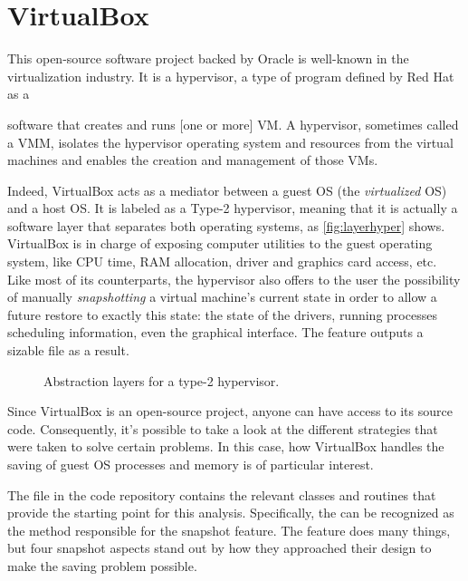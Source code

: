 \section{VirtualBox}\label{sec:virtualbox}
This open-source software project backed by Oracle is well-known in the virtualization industry. It is a hypervisor, a type of program defined by Red Hat as a
\begin{shadedquotation}
	[...] software that creates and runs [one or more] \gls{VM}. A hypervisor, sometimes called a \gls{VMM}, isolates the hypervisor operating system and resources from the virtual machines and enables the creation and management of those VMs.\cite{online:redhat}
\end{shadedquotation}
Indeed, VirtualBox acts as a mediator between a guest OS (the \textit{virtualized} OS) and a host OS. It is labeled as a Type-2 hypervisor, meaning that it is actually a software layer that separates both operating systems, as \autoref{fig:layerhyper} shows. VirtualBox is in charge of exposing computer utilities to the guest operating system, like CPU time, RAM allocation, driver and graphics card access, etc. Like most of its counterparts, the hypervisor also offers to the user the possibility of manually \textit{snapshotting} a virtual machine's current state in order to allow a future restore to exactly this state: the state of the drivers, running processes scheduling information, even the graphical interface. The feature outputs a sizable file as a result.

\begin{figure}
	\centering \scriptsize
	\vspace{-12pt}
	
	\caption{Abstraction layers for a type-2 hypervisor.}
	\label{fig:layerhyper}
	\vspace{-12pt}
\end{figure}
Since VirtualBox is an open-source project, anyone can have access to its source code. Consequently, it's possible to take a look at the different strategies that were taken to solve certain problems. In this case, how VirtualBox handles the saving of guest OS processes and memory is of particular interest.

The  file in the code repository contains the relevant \Cpp classes and routines that provide the starting point for this analysis. Specifically, the  can be recognized as the method responsible for the snapshot feature. The feature does many things, but four snapshot aspects stand out by how they approached their design to make the saving problem possible.

